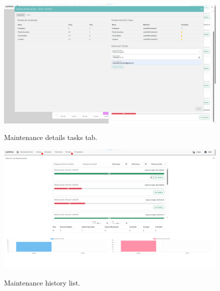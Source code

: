 
\begin{figure}[h]
  \caption{Maintenance details tasks tab.}
  \centering
  \includegraphics[width=\textwidth]{figs/Implementation/workshopmanager/maintenanceDetailsTask}
  \label{fig:workshopmanagerMaintenanceDetailsTask}
\end{figure}

\begin{figure}[h]
  \caption{Maintenance history list.}
  \centering
  \includegraphics[width=\textwidth]{figs/Implementation/workshopmanager/maintenanceHistory}
  \label{fig:maintenanceHistory}
\end{figure}

